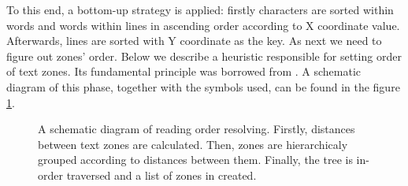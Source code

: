To this end, a bottom-up strategy is applied: firstly characters are sorted within words and words within lines in ascending order according to X coordinate value. Afterwards, lines are sorted with Y coordinate as the key. As next we need to figure out zones' order. Below we describe a heuristic responsible for setting order of text zones. Its fundamental principle was borrowed from \cite{Agrawal2009}. A schematic diagram of this phase, together with the symbols used, can be found in the figure \ref{fig:reading_order}.
\begin{figure}[]
  \centering
  
  \caption{A schematic diagram of reading order resolving. Firstly, distances between text zones are calculated. Then, zones are hierarchicaly grouped according to distances between them. Finally, the tree is in-order traversed and a list of zones in created.}
  \label{fig:reading_order}
\end{figure}
